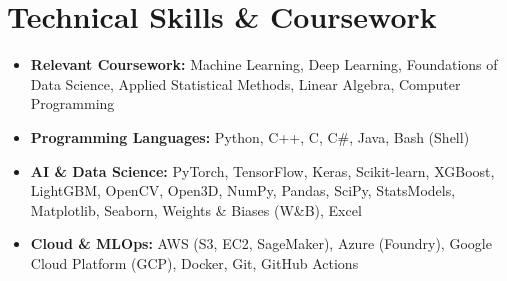 \documentclass[letterpaper,10pt]{article}
\newcommand{\nbresumeItemListStart}{
  \begin{itemize}[leftmargin=0.10in, label={}, itemsep=2pt, parsep=2pt]\vspace{6pt}
}
\newcommand{\nbresumeItem}[1]{
  \item \small{#1}
}
\newcommand{\nbresumeItemListEnd}{
  \end{itemize}\vspace{-6pt}
}
\begin{document}
\section{Technical Skills \& Coursework}
\nbresumeItemListStart
  \nbresumeItem{\textbf{Relevant Coursework:} Machine Learning, Deep Learning, Foundations of Data Science, Applied Statistical Methods, Linear Algebra, Computer Programming}
  \nbresumeItem{\textbf{Programming Languages:} Python, C++, C, C\#, Java, Bash (Shell)}
  \nbresumeItem{\textbf{AI \& Data Science:} PyTorch, TensorFlow, Keras, Scikit-learn, XGBoost, LightGBM, OpenCV, Open3D, NumPy, Pandas, SciPy, StatsModels, Matplotlib, Seaborn, Weights \& Biases (W\&B), Excel}
  \nbresumeItem{\textbf{Cloud \& MLOps:} AWS (S3, EC2, SageMaker), Azure (Foundry), Google Cloud Platform (GCP), Docker, Git, GitHub Actions}
\nbresumeItemListEnd
\end{document}
